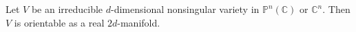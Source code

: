 Let $V$ be an irreducible $d$-dimensional nonsingular variety in $\mathbb{P}^n(\mathbb{C})$ or $\mathbb{C}^n$. Then $V$ is orientable as a real $2d$-manifold.
